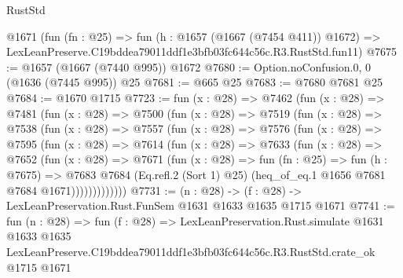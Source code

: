 \begin{lexlean}{RustStd}
\begin{coremodule}
    @1671
    (fun (fn : @25) =>
    fun (h : @1657 (@1667 (@7454 @411)) @1672) =>
    LexLeanPreserve.C19bddea79011ddf1e3bfb03fc644c56c.R3.RustStd.fun11)
@7675 := @1657 (@1667 (@7440 @995)) @1672
@7680 := Option.noConfusion.{0, 0} (@1636 (@7445 @995)) @25
@7681 := @665 @25
@7683 := @7680 @7681 @25
@7684 := @1670 @1715
@7723 := fun (x : @28) =>
  @7462
    (fun (x : @28) =>
    @7481
      (fun (x : @28) =>
      @7500
        (fun (x : @28) =>
        @7519
          (fun (x : @28) =>
          @7538
            (fun (x : @28) =>
            @7557
              (fun (x : @28) =>
              @7576
                (fun (x : @28) =>
                @7595
                  (fun (x : @28) =>
                  @7614
                    (fun (x : @28) =>
                    @7633
                      (fun (x : @28) =>
                      @7652
                        (fun (x : @28) =>
                        @7671
                          (fun (x : @28) =>
                          fun (fn : @25) =>
                          fun (h : @7675) =>
                          @7683
                            @7684
                            (Eq.refl.{2} (Sort 1) @25)
                            (heq_of_eq.{1} @1656 @7681 @7684 @1671)))))))))))))
@7731 := (n : @28) -> (f : @28) -> LexLeanPreservation.Rust.FunSem @1631 @1633 @1635 @1715 @1671
@7741 := fun (n : @28) =>
  fun (f : @28) =>
  LexLeanPreservation.Rust.simulate
    @1631
    @1633
    @1635
    LexLeanPreserve.C19bddea79011ddf1e3bfb03fc644c56c.R3.RustStd.crate_ok
    @1715
    @1671
\end{coremodule}
\end{lexlean}
